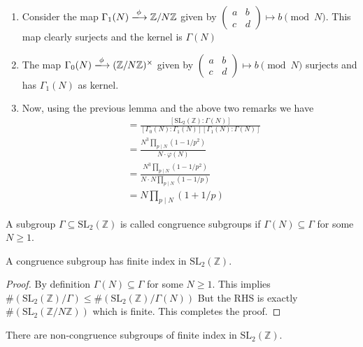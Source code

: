 \documentclass[oneside, 12pt]{scrbook}
\newcommand{\ZZ}{\mathbb Z}
\newcommand{\SL}{\mathrm{SL}}
\theoremstyle{theorem}
\begin{document}
\begin{remark}[DS, Exercise 1.2.3]
\begin{enumerate}
\item Consider the map $\Gamma_{1}(N) \xlongrightarrow{\phi} \ZZ/N\ZZ$ given by $\begin{pmatrix}
a & b \\ c&d
\end{pmatrix} \mapsto b \pmod{N}$. This map clearly surjects and the kernel is $\Gamma(N)$
\item The map $\Gamma_{0}(N) \xlongrightarrow{\phi} (\ZZ/N\ZZ)^{\times}$ given by $\begin{pmatrix}
a & b \\ c&d
\end{pmatrix} \mapsto b \pmod{N}$ surjects and has $\Gamma_{1}(N)$ as kernel.
\item Now, using the previous lemma and the above two remarks we have 
\begin{align*}
[\SL_{2}(\ZZ): \Gamma_{0}(N)] &= \frac{[\SL_{2}(\ZZ): \Gamma(N)]}{[\Gamma_{0}(N): \Gamma_{1}(N)][\Gamma_{1}(N):\Gamma(N)]} \\
&=\frac{N^3 \prod_{p \mid N} (1-1/p^2)}{N \cdot \varphi(N)}\\
&=\frac{N^3 \prod_{p \mid N} (1-1/p^2)}{N \cdot N \prod_{p \mid N} (1-1/p)}\\
&= N \prod_{p \mid N} (1 + 1/p)
\end{align*}
\end{enumerate}
\end{remark}

\begin{definition}
A subgroup $\Gamma \subseteq \mathrm{SL}_{2}(\ZZ)$ is called congruence subgroups if $\Gamma(N) \subseteq \Gamma$ for some $N \geq 1$.
\end{definition}

\begin{lemma}
A congruence subgroup has finite index in $\mathrm{SL}_{2}(\ZZ)$.
\end{lemma}

\begin{proof}
By definition $\Gamma (N) \subseteq \Gamma$ for some $N \geq 1$. This implies $\#(\SL_{2}(\ZZ)/\Gamma) \le \#(\SL_{2}(\ZZ)/\Gamma(N))$ But the RHS is exactly $\#(\SL_{2}(\ZZ/N\ZZ))$ which is finite. This completes the proof.
\end{proof}

\begin{remark}
There are non-congruence subgroups of finite index in $\mathrm{SL}_{2}(\ZZ)$.
\end{remark}
\end{document}
